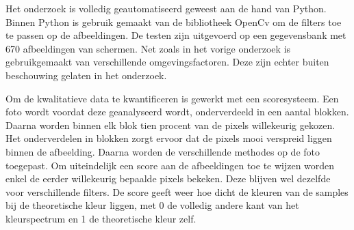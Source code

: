 Het onderzoek is volledig geautomatiseerd geweest aan de hand van Python. Binnen Python is gebruik gemaakt van de bibliotheek OpenCv om de filters toe te passen op de afbeeldingen. \cite{opencv} De testen zijn uitgevoerd op een gegevensbank met 670 afbeeldingen van schermen. Net zoals in het vorige onderzoek is gebruikgemaakt van verschillende omgevingsfactoren. Deze zijn echter buiten beschouwing gelaten in het onderzoek. 

Om de kwalitatieve data te kwantificeren is gewerkt met een scoresysteem. Een foto wordt voordat deze geanalyseerd wordt, onderverdeeld in een aantal blokken. Daarna worden binnen elk blok tien procent van de pixels willekeurig gekozen. Het onderverdelen in blokken zorgt ervoor dat de pixels mooi verspreid liggen binnen de afbeelding. Daarna worden de verschillende methodes op de foto toegepast. Om uiteindelijk een score aan de afbeeldingen toe te wijzen worden enkel de eerder willekeurig bepaalde pixels bekeken. Deze blijven wel dezelfde voor verschillende filters. De score geeft weer hoe dicht de kleuren van de samples bij de theoretische kleur liggen, met 0 de volledig andere kant van het kleurspectrum en 1 de theoretische kleur zelf.